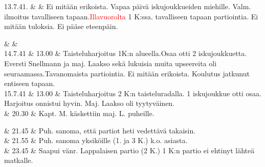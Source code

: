 \documentclass[11pt,a5paper,oneside]{book}
\begin{document}
13.7.41. & & Ei mitään erikoista. Vapaa päivä iskujoukkueiden miehille. Valm. ilmoitus tavalliseen tapaan.\newline \textcolor{red}{Illavuorolta} 1 K:ssa. tavalliseen tapaan partiointia. Ei mitään tuloksia. Ei pääse eteenpäin. \\
\newpage

& & \newline\newline\newline\newline \\

14.7.41 & 13.00 & Taisteluharjoitus 1K:n alueella.\newline Osaa otti 2 iskujoukkuetta. \newline Eversti Snellmann ja maj. Laakso sekä lukuisia muita upseereita oli seuraamassa.\newline Tavanomaista partiointia. Ei mitään erikoista. Koulutus jatkunut entiseen tapaan. \newline\newline\newline\newline\newline \\

15.7.41 & 13.00 & Taisteluharjoitus 2 K:n taisteluradalla. 1 iskujoukkue otti osaa. Harjoitus onnistui hyvin. Maj. Laakso oli tyytyväinen.\newline \\ 

& 20.30 & Kapt. M. käskettiin maj. L. puheille. \\

\taulustop


& 21.45 & Puh. sanoma, että partiot heti vedettävä takaisin. \\

& 21.55 & Puh. sanoma yksiköille (1. ja 3 K.) k.o. asiasta. \\

& 23.45 & Saapui vänr. Lappalaisen partio (2 K.) 1 K:n partio ei ehtinyt lähteä matkalle. \newline\newline\newline\newline\newline \\
\end{document}
